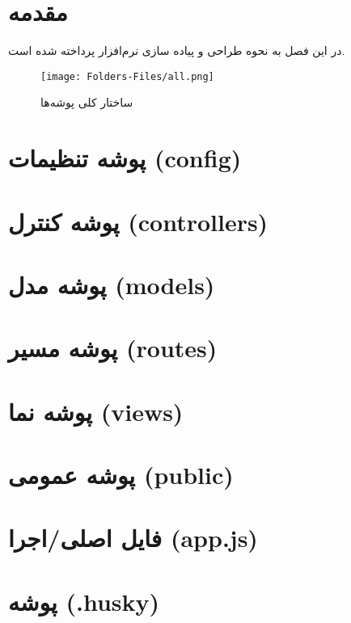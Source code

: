 


\section*{مقدمه}
در این فصل به نحوه طراحی و پیاده سازی نرم‌افزار پرداخته شده است.
\begin{figure}[H]
	\texttt{[image: Folders-Files/all.png]}
	\centering
	\caption{ساختار کلی پوشه‌ها}
	\label{fig:folder-main}
\end{figure}

\section{پوشه تنظیمات (config)}


\section{پوشه کنترل (controllers)}


\section{پوشه مدل (models)}


\section{پوشه مسیر (routes)}


\section{پوشه نما (views)}


\section{پوشه عمومی‌ (public)}


\section{فایل اصلی/اجرا (app.js)}


\section{پوشه  (.husky)}


